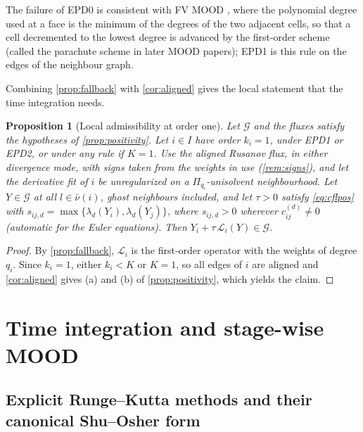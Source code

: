 \documentclass[11pt,a4paper]{article}
\theoremstyle{plain}
\newtheorem{proposition}[theorem]{Proposition}
\theoremstyle{definition}
\theoremstyle{remark}
\numberwithin{equation}{section}
\newcommand{\cnb}{\bar\nu}
\newcommand{\Ad}{\mathcal{G}}
\newcommand{\Lop}{\mathcal{L}}
\begin{document}
The failure of EPD0 is consistent with FV MOOD \cite{Clain2011}, where the polynomial degree used at a face is the minimum of the degrees of the two adjacent cells, so that a cell decremented to the lowest degree is advanced by the first-order scheme (called the parachute scheme in later MOOD papers); EPD1 is this rule on the edges of the neighbour graph.

Combining \cref{prop:fallback} with \cref{cor:aligned} gives the local statement that the time integration needs.

\begin{proposition}[Local admissibility at order one]\label{prop:local}
Let $\Ad$ and the fluxes satisfy the hypotheses of \cref{prop:positivity}. Let $i\in I$ have order $k_i=1$, under EPD1 or EPD2, or under any rule if $K=1$. Use the aligned Rusanov flux, in either divergence mode, with signs taken from the weights in use (\cref{rem:signs}), and let the derivative fit of $i$ be unregularized on a $\Pi_{q_i}$-unisolvent neighbourhood. Let $Y\in\Ad$ at all $l\in\cnb(i)$, ghost neighbours included, and let $\tau>0$ satisfy \eqref{eq:cflpos} with $s_{ij,d}=\max\{\lambda_d(Y_i),\lambda_d(Y_j)\}$, where $s_{ij,d}>0$ wherever $c^{(d)}_{ij}\ne0$ (automatic for the Euler equations). Then $Y_i+\tau\,\Lop_i(Y)\in\Ad$.
\end{proposition}

\begin{proof}
By \cref{prop:fallback}, $\Lop_i$ is the first-order operator with the weights of degree $q_i$. Since $k_i=1$, either $k_i<K$ or $K=1$, so all edges of $i$ are aligned and \cref{cor:aligned} gives (a) and (b) of \cref{prop:positivity}, which yields the claim.
\end{proof}

\section{Time integration and stage-wise MOOD}\label{sec:time}

\subsection{Explicit Runge--Kutta methods and their canonical Shu--Osher form}
\end{document}
